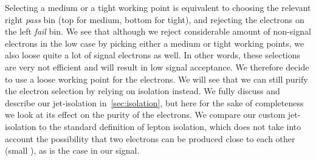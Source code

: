 Selecting a medium or a tight working point is equivalent to choosing the relevant right \emph{pass} bin (top for medium, bottom for tight), and rejecting the electrons on the left \emph{fail} bin. We see that although we reject considerable amount of non-signal electrons in the low \dm case by picking either a medium or tight working points, we also loose quite a lot of signal electrons as well. In other words, these selections are very not efficient and will result in low signal acceptance. We therefore decide to use a loose working point for the electrons. We will see that we can still purify the electron selection by relying on isolation instead. We fully discuss and describe our jet-isolation in~\ref{sec:isolation}, but here for the sake of completeness we look at its effect on the purity of the electrons. We compare our custom jet-isolation to the standard definition of lepton isolation, which does not take into account the possibility that two electrons can be produced close to each other (small \DR), as is the case in our signal.

